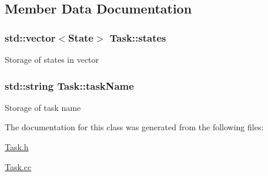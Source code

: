 \subsection{Member Data Documentation}
\hypertarget{classTask_a88351cfb81ef77759a8bc117083733fb}{
\subsubsection[{states}]{\setlength{\rightskip}{0pt plus 5cm}std\-::vector$<${\bf State}$>$ Task\-::states\hspace{0.3cm}{\ttfamily [private]}}}\label{classTask_a88351cfb81ef77759a8bc117083733fb}
Storage of states in vector \hypertarget{classTask_a36551b2c460ad511f54cbf203e309917}{
\subsubsection[{task\-Name}]{\setlength{\rightskip}{0pt plus 5cm}std\-::string Task\-::task\-Name\hspace{0.3cm}{\ttfamily [private]}}}\label{classTask_a36551b2c460ad511f54cbf203e309917}
Storage of task name 

The documentation for this class was generated from the following files\-:\begin{DoxyCompactItemize}
\item 
\hyperlink{Task_8h}{Task.\-h}\item 
\hyperlink{Task_8cc}{Task.\-cc}\end{DoxyCompactItemize}
